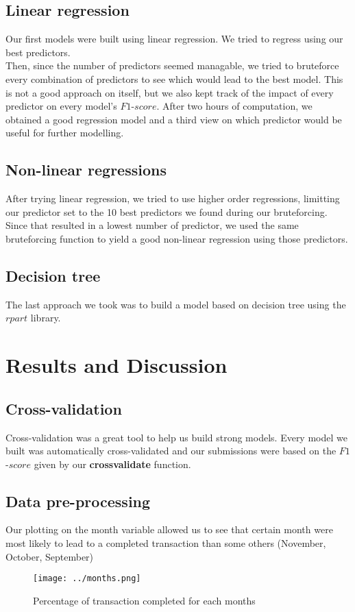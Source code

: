\documentclass[11pt]{article}
\begin{document}
\subsection*{Linear regression}
Our first models were built using linear regression. We tried to regress using our best predictors. \\
Then, since the number of predictors seemed managable, we tried to bruteforce every combination of predictors to see which would lead to the best model. This is not a good approach on itself, but we also kept track of the impact of every predictor on every model's $F1$-$score$. After two hours of computation, we obtained a good regression model and a third view on which predictor would be useful for further modelling.
\subsection*{Non-linear regressions}
After trying linear regression, we tried to use higher order regressions, limitting our predictor set to the 10 best predictors we found during our bruteforcing.\\
Since that resulted in a lowest number of predictor, we used the same bruteforcing function to yield a good non-linear regression using those predictors.
\subsection*{Decision tree}
The last approach we took was to build a model based on decision tree using the $rpart$ library.
\newpage
\section*{Results and Discussion}
\subsection*{Cross-validation}
Cross-validation was a great tool to help us build strong models. Every model we built was automatically cross-validated and our submissions were based on the $F1$-$score$ given by our \textbf{crossvalidate} function.
\subsection*{Data pre-processing}
Our plotting on the month variable allowed us to see that certain month were most likely to lead to a completed transaction than some others (November, October, September)
\begin{figure}[h]
\centering
\texttt{[image: ../months.png]}
\caption{Percentage of transaction completed for each months}
\end{figure}
\end{document}
